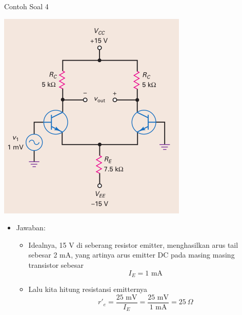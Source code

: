 \documentclass[aspectratio=169]{beamer}
\begin{document}
\begin{frame}{Contoh Soal 4}
	\begin{multicols}{2}
		\begin{center}
			\includegraphics[height=0.7\textheight]{gambar/01.diff-amp/01.contoh_soal_1-2}
		\end{center}
		\columnbreak
		\begin{itemize}
			\item Jawaban:
			\begin{itemize}
				\item Idealnya, 15 V di seberang resistor emitter, menghasilkan arus tail sebesar 2 mA, yang artinya arus emitter DC pada masing masing transistor sebesar
				\[ I_E = 1 \text{ mA} \]
				\item Lalu kita hitung resistansi emitternya
				\[ r'_e = \frac{25 \text{ mV}}{ I_E} =\frac{25 \text{ mV}}{1 \text{ mA}} = 25~\Omega \]
			\end{itemize}
		\end{itemize}
	\end{multicols}
\end{frame}
\end{document}
